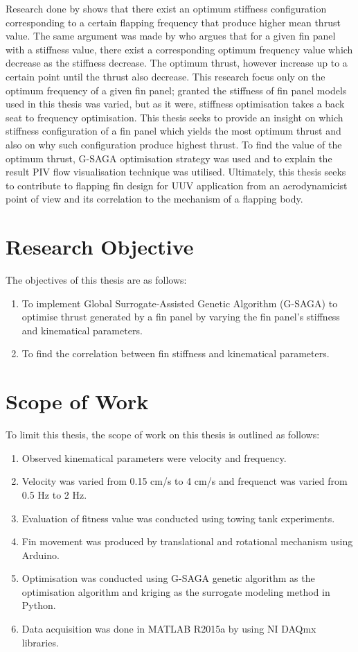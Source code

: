 Research done by \citet{Esposito56} shows that there exist an optimum stiffness configuration corresponding to a certain flapping frequency that produce higher mean thrust value. The same argument was made by \citet{luqman} who argues that for a given fin panel with a stiffness value, there exist a corresponding optimum frequency value which decrease as the stiffness decrease. The optimum thrust, however increase up to a certain point until the thrust also decrease. This research focus only on the optimum frequency of a given fin panel; granted the stiffness of fin panel models used in this thesis was varied, but as it were, stiffness optimisation takes a back seat to frequency optimisation. This thesis seeks to provide an insight on which stiffness configuration of a fin panel which yields the most optimum thrust and also on why such configuration produce highest thrust. To find the value of the optimum thrust, G-SAGA optimisation strategy was used and to explain the result PIV flow visualisation technique was utilised. Ultimately, this thesis seeks to contribute to flapping fin design for UUV application from an aerodynamicist point of view and its correlation to the mechanism of a flapping body.
\section{Research Objective}
\label{sec:2}
The objectives of this thesis are as follows:
\begin{enumerate}
    \item To implement Global Surrogate-Assisted Genetic Algorithm (G-SAGA) to optimise thrust generated by a fin panel by varying the fin panel's stiffness and kinematical parameters.
    \item To find the correlation between fin stiffness and kinematical parameters.
\end{enumerate}
\section{Scope of Work}
\label{sec:3}
To limit this thesis, the scope of work on this thesis is outlined as follows:
\begin{enumerate}
    \item Observed kinematical parameters were velocity and frequency.
    \item Velocity was varied from 0.15 cm/s to 4 cm/s and frequenct was varied from 0.5 Hz to 2 Hz.
    \item Evaluation of fitness value was conducted using towing tank experiments.
    \item Fin movement was produced by translational and rotational mechanism using Arduino.
    \item Optimisation was conducted using G-SAGA genetic algorithm as the optimisation algorithm and kriging as the surrogate modeling method in Python.
    \item Data acquisition was done in MATLAB R2015a by using NI DAQmx libraries.
\end{enumerate}
